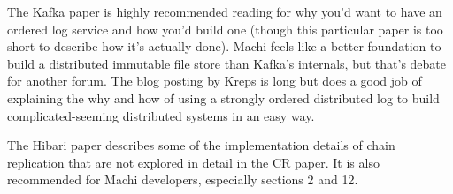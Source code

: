 \documentclass[preprint,10pt]{sigplanconf}
\begin{document}
The Kafka paper \cite{kafka} is highly recommended reading for why
you'd want to have an ordered log service and how you'd build one
(though this particular paper is too short to describe how it's
actually done).
Machi feels like a better foundation to build a
distributed immutable file store than Kafka's internals, but
that's debate for another forum.  The blog posting by Kreps
\cite{the-log-what} is long but does a good job of explaining
the why and how of using a strongly ordered distributed log to build
complicated-seeming distributed systems in an easy way.

The Hibari paper \cite{cr-theory-and-practice} describes some of the
implementation details of chain replication that are not explored in
detail in the CR paper.  It is also recommended for Machi developers,
especially sections 2 and 12.
\end{document}
